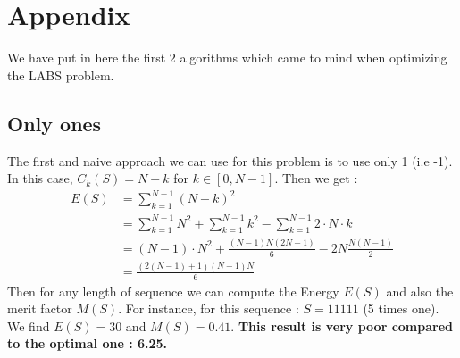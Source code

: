 \documentclass[a4paper,11pt,openany]{article}
\begin{document}
\newpage
\section{Appendix}
\noindent
We have put in here the first 2 algorithms which came to mind when optimizing the LABS problem.
\subsection{Only ones}
\label{only_ones}
\noindent
The first and naive approach we can use for this problem is to use only 1 (i.e -1). In this case, $C_k(S)=N-k$ for $k\in [0,N-1]$. Then we get :\\
\begin{equation}
\begin{split}
E(S)&=\sum_{k=1}^{N-1}(N-k)^2\\
&=\sum_{k=1}^{N-1}N^2+\sum_{k=1}^{N-1}k^2-\sum_{k=1}^{N-1}2\cdot N\cdot k\\
&=(N-1)\cdot N^2+\frac{(N-1)N(2N-1)}{6}-2N\frac{N(N-1)}{2}\\
&=\frac{(2(N-1)+1)(N-1)N}{6}
\end{split}
\end{equation}
\noindent
Then for any length of sequence we can compute the Energy $E(S)$ and also the merit factor $M(S)$. For instance, for this sequence : $S=11111$ (5 times one). We find $E(S)=30$ and $M(S)=0.41$. \textbf{This result is very poor compared to the optimal one : 6.25.}
\end{document}
